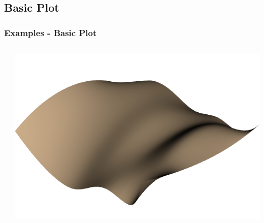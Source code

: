 \documentclass[t]{beamer}
\begin{document}
\subsection{Basic Plot}
\begin{frame}
  \frametitle{Examples - Basic Plot}

  \begin{center}
    \begin{columns}[T]
      \begin{column}{.5\textwidth}
        \inputminted[fontsize=\footnotesize]{python}{code/basic_usage.py}
      \end{column}

      \begin{column}{.5\textwidth}
        \centering
        \includegraphics[width=1.0\textwidth]{figures/basic_usage.png}
      \end{column}
    \end{columns}
  \end{center}

\end{frame}


\end{document}
